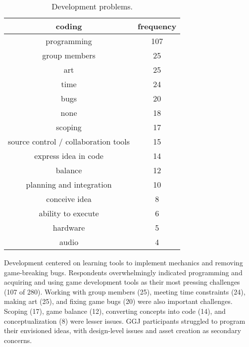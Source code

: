 \documentclass{sig-alternate}
\begin{document}
\begin{table}[tb]
\centering
\scriptsize
\begin{tabular}{|c|c|}
\hline coding & frequency \\ 
\hline programming & 107 \\ 
\hline group members & 25 \\ 
\hline art & 25 \\ 
\hline time & 24 \\ 
\hline bugs & 20 \\ 
\hline none & 18 \\ 
\hline scoping & 17 \\ 
\hline source control / collaboration tools & 15 \\ 
\hline express idea in code & 14 \\ 
\hline balance & 12 \\ 
\hline planning and integration & 10 \\ 
\hline conceive idea & 8 \\ 
\hline ability to execute & 6 \\ 
\hline hardware & 5 \\ 
\hline audio & 4 \\
\hline 
\end{tabular}
\caption{Development problems.}
\label{tab:problem}
\end{table}

Development centered on learning tools to implement mechanics and removing game-breaking bugs. 
Respondents overwhelmingly indicated programming and acquiring and using game development tools as their most pressing challenges (107 of 280). 
Working with group members (25), meeting time constraints (24), making art (25), and fixing game bugs (20) were also important challenges. 
Scoping (17), game balance (12), converting concepts into code (14), and conceptualization (8) were lesser issues.
GGJ participants struggled to program their envisioned ideas, with design-level issues and asset creation as secondary concerns.


\end{document}

